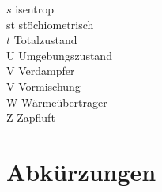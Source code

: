 \begin{tabbing}
    $s$     \>  isentrop                                            \\
    st      \>  stöchiometrisch                                     \\
    $t$     \>  Totalzustand                                        \\
    U       \>  Umgebungszustand                                    \\
    V       \>  Verdampfer                                          \\
    V       \>  Vormischung                                         \\
    W       \>  Wärmeübertrager                                     \\
    Z       \>  Zapfluft                                            \\

\end{tabbing}

\section*{Abkürzungen}

